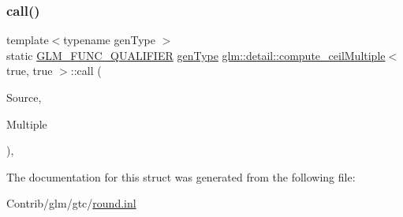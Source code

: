 \subsubsection{\texorpdfstring{call()}{call()}}
{\footnotesize\ttfamily template$<$typename gen\+Type $>$ \\
static \mbox{\hyperlink{setup_8hpp_a33fdea6f91c5f834105f7415e2a64407}{G\+L\+M\+\_\+\+F\+U\+N\+C\+\_\+\+Q\+U\+A\+L\+I\+F\+I\+ER}} \mbox{\hyperlink{structglm_1_1detail_1_1gen_type}{gen\+Type}} \mbox{\hyperlink{structglm_1_1detail_1_1compute__ceil_multiple}{glm\+::detail\+::compute\+\_\+ceil\+Multiple}}$<$ true, true $>$\+::call (\begin{DoxyParamCaption}\item[{\mbox{\hyperlink{structglm_1_1detail_1_1gen_type}{gen\+Type}}}]{Source,  }\item[{\mbox{\hyperlink{structglm_1_1detail_1_1gen_type}{gen\+Type}}}]{Multiple }\end{DoxyParamCaption})\hspace{0.3cm}{\ttfamily [inline]}, {\ttfamily [static]}}



The documentation for this struct was generated from the following file\+:\begin{DoxyCompactItemize}
\item 
Contrib/glm/gtc/\mbox{\hyperlink{round_8inl}{round.\+inl}}\end{DoxyCompactItemize}
